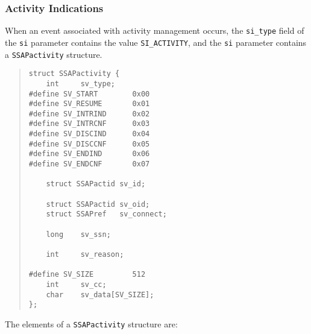 \subsubsection	{Activity Indications}
When an event associated with activity management occurs,
the \verb"si_type" field of the \verb"si" parameter contains the value
\verb"SI_ACTIVITY",
and the \verb"si" parameter contains a \verb"SSAPactivity" structure.
\begin{quote}\small\begin{verbatim}
struct SSAPactivity {
    int     sv_type;
#define SV_START        0x00
#define SV_RESUME       0x01
#define SV_INTRIND      0x02
#define SV_INTRCNF      0x03
#define SV_DISCIND      0x04
#define SV_DISCCNF      0x05
#define SV_ENDIND       0x06
#define SV_ENDCNF       0x07

    struct SSAPactid sv_id;

    struct SSAPactid sv_oid;
    struct SSAPref   sv_connect;

    long    sv_ssn;

    int     sv_reason;

#define SV_SIZE         512
    int     sv_cc;
    char    sv_data[SV_SIZE];
};
\end{verbatim}\end{quote}
The elements of a \verb"SSAPactivity" structure are:
